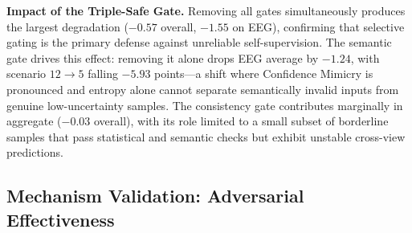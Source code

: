 \documentclass[sigconf, screen, review, anonymous]{acmart}
\theoremstyle{plain}
\theoremstyle{definition}
\theoremstyle{remark}
\begin{document}
	\textbf{Impact of the Triple-Safe Gate.}
	Removing all gates simultaneously produces the largest degradation ($-0.57$ overall, $-1.55$ on EEG), confirming that selective gating is the primary defense against unreliable self-supervision. The semantic gate drives this effect: removing it alone drops EEG average by $-1.24$, with scenario $12{\to}5$ falling $-5.93$ points---a shift where Confidence Mimicry is pronounced and entropy alone cannot separate semantically invalid inputs from genuine low-uncertainty samples. The consistency gate contributes marginally in aggregate ($-0.03$ overall), with its role limited to a small subset of borderline samples that pass statistical and semantic checks but exhibit unstable cross-view predictions.


	\subsection{Mechanism Validation: Adversarial Effectiveness}
	\label{sec:mechanism}
\end{document}
